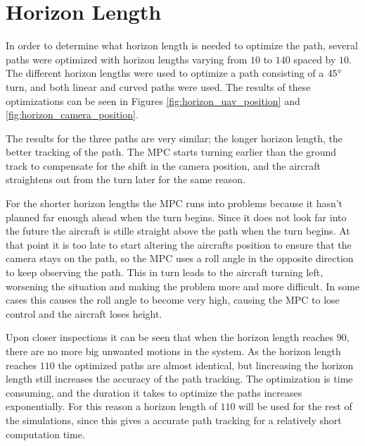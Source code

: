 \section{Horizon Length}

In order to determine what horizon length is needed to optimize the path, several paths were optimized with horizon lengths varying from $10$ to $140$ spaced by $10$. The different horizon lengths were used to optimize a path consisting of a $45\degree$ turn, and both linear and curved paths were used. The results of these optimizations can be seen in Figures \ref{fig:horizon_uav_position} and \ref{fig:horizon_camera_position}.

The results for the three paths are very similar; the longer horizon length, the better tracking of the path. The MPC starts turning earlier than the ground track to compensate for the shift in the camera position, and the aircraft straightens out from the turn later for the same reason.

For the shorter horizon lengths the MPC runs into problems because it hasn't planned far enough ahead when the turn begins. Since it does not look far into the future the aircraft is stille straight above the path when the turn begins. At that point it is too late to start altering the aircrafts position to ensure that the camera stays on the path, so the MPC uses a roll angle in the opposite direction to keep observing the path. This in turn leads to the aircraft turning left, worsening the situation and making the problem more and more difficult. In some cases this causes the roll angle to become very high, causing the MPC to lose control and the aircraft loses height.

Upon closer inspections it can be seen that when the horizon length reaches $90$, there are no more big unwanted motions in the system. As the horizon length reaches $110$ the optimized paths are almost identical, but lincreasing the horizon length still increases the accuracy of the path tracking. The optimization is time consuming, and the duration it takes to optimize the paths increases exponentially. For this reason a horizon length of $110$ will be used for the rest of the simulations, since this gives a accurate path tracking for a relatively short computation time.


